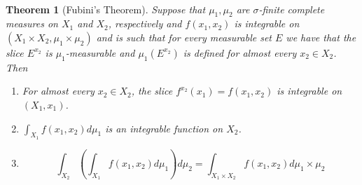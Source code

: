 \documentclass{article}
\newtheorem*{thm}{\\ Theorem}
\begin{document}
\begin{thm}[Fubini's Theorem]
  Suppose that $\mu_1,\mu_2$ are $\sigma$-finite complete measures on
  $X_1$ and $X_2$, respectively and $f(x_1,x_2)$ is integrable on
  $(X_1 \times X_2, \mu_1 \times \mu_2)$ and is such that for every
  measurable set $E$ we have that the slice $E^{x_2}$ is
  $\mu_1$-measurable and $\mu_1(E^{x_2})$ is defined for almost every
  $x_2 \in X_2$. Then
  \begin{enumerate}
  \item For almost every $x_2 \in X_2$, the slice $f^{x_2}(x_1) =
    f(x_1,x_2)$ is integrable on $(X_1, x_1)$.
  \item $\int_{X_1}f(x_1,x_2)d\mu_1$ is an integrable function on
    $X_2$.
  \item \[\int_{X_2}\left(\int_{X_1}f(x_1,x_2)d\mu_1\right)d\mu_2 =
    \int_{X_1\times X_2}f(x_1,x_2)d\mu_1\times \mu_2\]
  \end{enumerate}
\end{thm}
\end{document}
